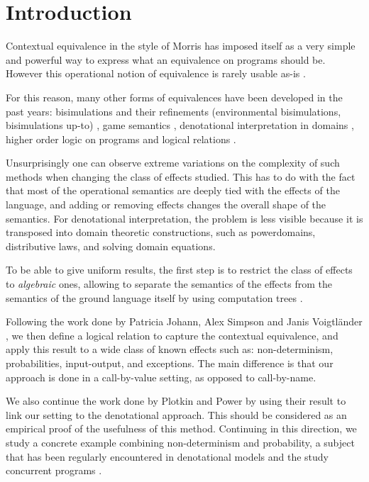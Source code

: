 \section{Introduction}

Contextual equivalence in the style of Morris
has imposed itself as a very simple and powerful
way to express what an equivalence on programs should be. 
However
this operational notion of equivalence is rarely usable 
as-is \cite{pitts1997operationally}.

For this reason, many other forms of equivalences have 
been developed in the past years: bisimulations 
and their refinements (environmental bisimulations, 
bisimulations up-to) \cite{koutavas2011applicative}, 
game semantics \cite{abramsky1999game}, 
denotational interpretation in domains \cite{scott1982domains}, 
higher order logic on 
programs \cite{honda2005observationally} 
and logical relations \cite{Pitts2000}.

Unsurprisingly one can observe extreme variations on 
the complexity of such methods when changing  
the class of effects studied. This has to do with 
the fact that most of the operational semantics 
are deeply tied with the effects of the language, 
and adding or removing effects changes the overall 
shape of the semantics. For denotational interpretation,
the problem is less visible because it is transposed 
into domain theoretic constructions, such as powerdomains, distributive laws,
and solving domain equations.

To be able to give uniform results, the first 
step is to restrict the class of effects
to \emph{algebraic} ones, 
allowing to separate the semantics 
of the effects from the semantics of the ground language
itself by using computation trees \cite{plotkin2001adequacy}.

Following the work done by Patricia
Johann, Alex Simpson and Janis Voigtländer \cite{gom}, we then define 
a logical relation to capture the contextual 
equivalence, and apply this result to a wide class of known effects 
such as: non-determinism, probabilities, input-output, and exceptions. 
The main difference is that our approach 
is done in a call-by-value setting, as opposed 
to call-by-name.


We also continue the work done by Plotkin and Power \cite{plotkin2001adequacy}
by using their result to link our setting to the denotational approach. This 
should be considered as an empirical proof of the usefulness of this method. 
Continuing in this direction, we study a concrete example combining
non-determinism and probability, a subject that has been regularly encountered 
in denotational models \cite{tix2009semantic} \cite{JGL-mscs16}
\cite{KeimelP2016} and the study concurrent programs
\cite{Mislove2000} \cite{mislove2004axioms}.
